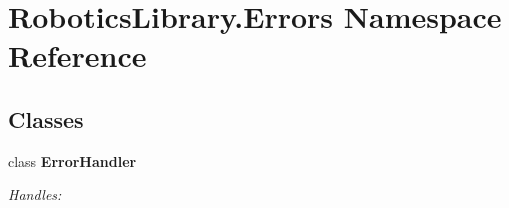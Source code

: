 \hypertarget{namespace_robotics_library_1_1_errors}{}\section{Robotics\+Library.\+Errors Namespace Reference}
\label{namespace_robotics_library_1_1_errors}
\subsection*{Classes}
\begin{DoxyCompactItemize}
\item 
class {\bfseries Error\+Handler}
\begin{DoxyCompactList}\small\item\em Handles\+: \end{DoxyCompactList}\end{DoxyCompactItemize}
